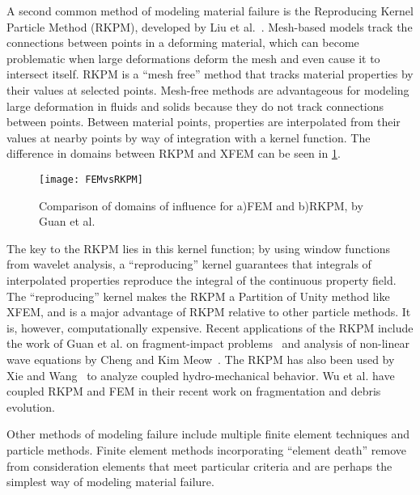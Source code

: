 A second common method of modeling material failure is the Reproducing Kernel Particle Method (RKPM), developed by Liu et al.~\cite{liu1995reproducing}.
Mesh-based models track the connections between points in a deforming material, which can become problematic when large deformations deform the mesh and even cause it to intersect itself.
RKPM is a ``mesh free'' method that tracks material properties by their values at selected points.
Mesh-free methods are advantageous for modeling large deformation in fluids and solids because they do not track connections between points.
Between material points, properties are interpolated from their values at nearby points by way of integration with a kernel function.
The difference in domains between RKPM and XFEM can be seen in \cref{fig:FEMvsRKPM}.
%
\begin{figure}[h]
  \centering
\texttt{[image: FEMvsRKPM]}
\caption[Comparison of domains of influence for FEM and RKPM]{Comparison of domains of influence for a)FEM and b)RKPM, by Guan et al. \cite{guan2011semi}}
\label{fig:FEMvsRKPM}
\end{figure}
%
The key to the RKPM lies in this kernel function; by using window functions from wavelet analysis, a ``reproducing'' kernel guarantees that  integrals of interpolated properties reproduce the integral of the continuous property field.
The ``reproducing'' kernel makes the RKPM a Partition of Unity method like XFEM, and is a major advantage of RKPM relative to other particle methods.
It is, however, computationally expensive.
Recent applications of the RKPM include the work of Guan et al. on fragment-impact problems~\cite{guan2011semi} and analysis of non-linear wave equations by Cheng and Kim Meow~\cite{cheng2012analyzing}.
The RKPM has also been used by Xie and Wang~\cite{xie2014stabilized} to analyze coupled hydro-mechanical behavior.
Wu et al. have coupled RKPM and FEM in their recent work on fragmentation and debris evolution\cite{wu2014fragmentation}.

Other methods of modeling failure include multiple finite element techniques and particle methods.
Finite element methods incorporating ``element death'' remove from consideration elements that meet particular criteria and are perhaps the simplest way of modeling material failure.

